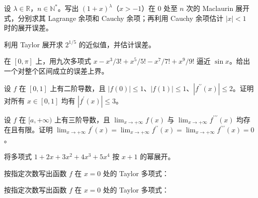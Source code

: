 \noindent\begin{minipage}{\textwidth}
设 $\lambda\in\mathbb R$，$n\in\mathbb N^*$。写出 $(1+x)^\lambda$（$x>-1$）在 $0$ 处至 $n$ 次的 Maclaurin 展开式，分别求其 Lagrange 余项和 Cauchy 余项；再利用 Cauchy 余项估计 $|x|<1$ 时的展开误差。
\end{minipage}\par\vfill
\noindent\begin{minipage}{\textwidth}
利用 Taylor 展开求 $2^{1/5}$ 的近似值，并估计误差。
\end{minipage}\par\vfill
\newpage
\noindent\begin{minipage}{\textwidth}
在 $[0,\pi]$ 上，用九次多项式 $x-x^3/3!+x^5/5!-x^7/7!+x^9/9!$ 逼近 $\sin x$。给出一个对整个区间成立的误差上界。
\end{minipage}\par\vfill
\noindent\begin{minipage}{\textwidth}
设 $f$ 在 $[0,1]$ 上有二阶导数，且 $|f(0)|\le1$、$|f(1)|\le1$、$|f^{\prime\prime}(x)|\le2$。证明对所有 $x\in[0,1]$ 均有 $|f^{\prime}(x)|\le3$。
\end{minipage}\par\vfill
\noindent\begin{minipage}{\textwidth}
设 $f$ 在 $[a,+\infty)$ 上有三阶导数，且 $\lim_{x\to+\infty}f(x)$ 与 $\lim_{x\to+\infty}f^{\prime\prime\prime}(x)$ 均存在且有限。证明 $\lim_{x\to+\infty}f^{\prime}(x)=\lim_{x\to+\infty}f^{\prime\prime}(x)=\lim_{x\to+\infty}f^{\prime\prime\prime}(x)=0$。
\end{minipage}\par\vfill
\newpage
\noindent\begin{minipage}{\textwidth}
将多项式 $1+2x+3x^2+4x^3+5x^4$ 按 $x+1$ 的幂展开。
\end{minipage}\par\vfill
\noindent\begin{minipage}{\textwidth}
按指定次数写出函数 $f$ 在 $x=0$ 处的 Taylor 多项式：
\end{minipage}\par\vfill
\noindent\begin{minipage}{\textwidth}
按指定次数写出函数 $f$ 在 $x=0$ 处的 Taylor 多项式：
\end{minipage}\par\vfill
